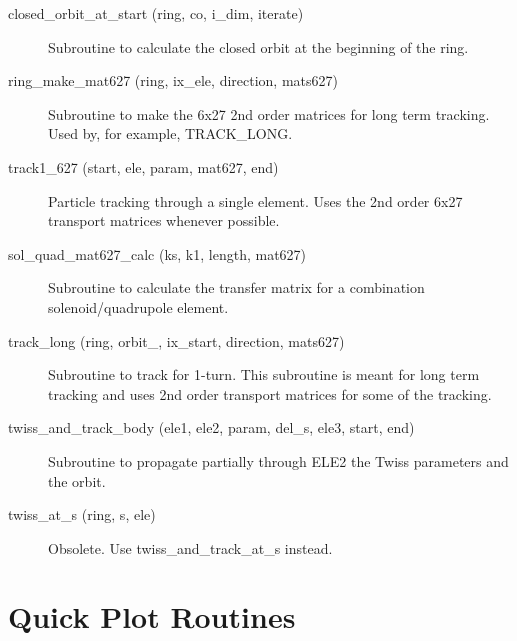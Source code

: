 \begin{description}

\item[closed\_orbit\_at\_start (ring, co, i\_dim, iterate)] \Newline
Subroutine to calculate the closed orbit at the beginning of the ring. 

\item[ring\_make\_mat627 (ring, ix\_ele, direction, mats627)] \Newline
Subroutine to make the 6x27 2nd order matrices for long term tracking. 
Used by, for example, TRACK\_LONG. 

\item[track1\_627 (start, ele, param, mat627, end)] \Newline
Particle tracking through a single element. Uses the 2nd order 6x27 transport 
matrices whenever possible. 

\item[sol\_quad\_mat627\_calc (ks, k1, length, mat627)] \Newline
Subroutine to calculate the transfer matrix for a combination solenoid/quadrupole element. 

\item[track\_long (ring, orbit\_, ix\_start, direction, mats627)] \Newline
Subroutine to track for 1-turn. This subroutine is meant for long term tracking and 
uses 2nd order transport matrices for some of the tracking. 

\item[twiss\_and\_track\_body (ele1, ele2, param, del\_s, ele3, start, end)] \Newline
Subroutine to propagate partially through ELE2 the Twiss parameters and the orbit. 

\item[twiss\_at\_s (ring, s, ele)] \Newline
Obsolete. Use twiss\_and\_track\_at\_s instead. 

\end{description}

\section{Quick Plot Routines}
\label{r:qp}      

